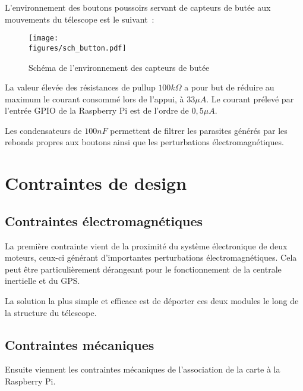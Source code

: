 \vspace{1cm}

L'environnement des boutons poussoirs servant de capteurs de butée aux mouvements du télescope est le suivant~:

\begin{figure}[H]
    \centering
    \texttt{[image: \\figures/sch\_button.pdf]}
    \decoRule
    \caption[
    Schéma de l'environnement des capteurs de butée]{
    Schéma de l'environnement des capteurs de butée}
    \label{fig:Schéma de l'environnement des capteurs de butée}
    \end{figure}

\vspace{1cm}

La valeur élevée des résistances de pullup $100k\Omega$ a pour but de réduire au maximum le courant consommé lors de l'appui, à $33\mu A$. Le courant prélevé par l'entrée GPIO de la Raspberry Pi est de l'ordre de $0,5\mu A$.

Les condensateurs de $100nF$ permettent de filtrer les parasites générés par les rebonds propres aux boutons ainsi que les perturbations électromagnétiques.

\section{Contraintes de design}

\subsection{Contraintes électromagnétiques}

La première contrainte vient de la proximité du système électronique de deux moteurs, ceux-ci générant d'importantes perturbations électromagnétiques. Cela peut être particulièrement dérangeant pour le fonctionnement de la centrale inertielle et du GPS.

La solution la plus simple et efficace est de déporter ces deux modules le long de la structure du télescope.


\subsection{Contraintes mécaniques}

Ensuite viennent les contraintes mécaniques de l'association de la carte à la Raspberry Pi.

